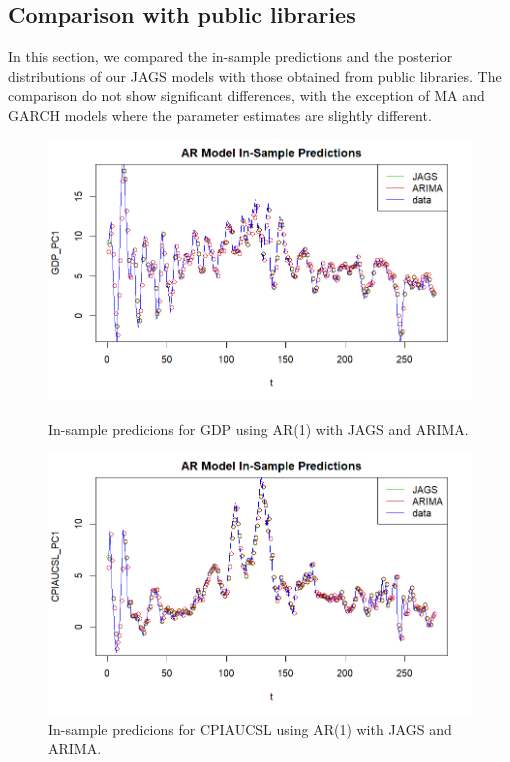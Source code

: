 \subsection*{Comparison with public libraries}
In this section, we compared the in-sample predictions and the posterior distributions of our JAGS models with those obtained from public libraries. The comparison do not show significant differences, with the exception of MA and GARCH models where the parameter estimates are slightly different.
\begin{figure}[H]
    \centering
    \begin{minipage}{0.49\textwidth}
        \centering
        \includegraphics[width=\textwidth]{images/2-AR/ARIMA_predictions_gdp.png}
        \caption{In-sample predicions for GDP using AR(1) with JAGS and ARIMA.}
        \label{fig:ARIMA_AR_gdp_prediction}
    \end{minipage}\hfill
    \begin{minipage}{0.49\textwidth}
        \centering
        \includegraphics[width=\textwidth]{images/2-AR/ARIMA_predictions_infl.png}
        \caption{In-sample predicions for CPIAUCSL using AR(1) with JAGS and ARIMA.}
        \label{fig:ARIMA_AR_infl_prediction}
    \end{minipage}
\end{figure}

